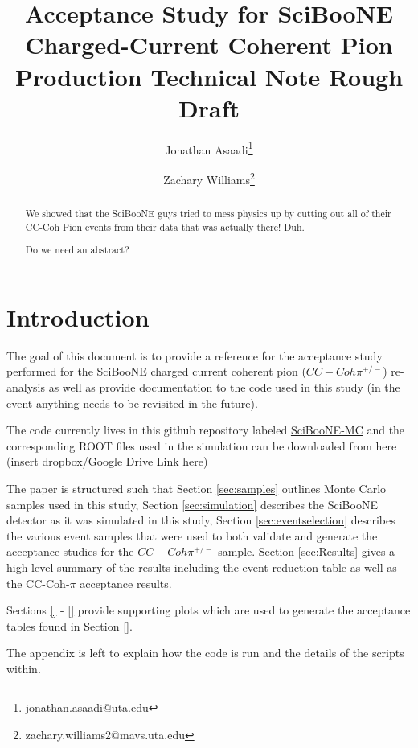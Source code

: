 \documentclass[11pt]{article}
\title{Acceptance Study for SciBooNE Charged-Current Coherent Pion Production Technical Note Rough Draft}
\author[1]{Jonathan Asaadi\thanks{jonathan.asaadi@uta.edu}}
\author[1]{Zachary Williams\thanks{zachary.williams2@mavs.uta.edu}}
\affil[1]{Department of Physics, The University of Texas at Arlington}
\begin{document}
\begin{minipage}[h]{\textwidth}
\maketitle
\begin{abstract}
We showed that the SciBooNE guys tried to mess physics up by cutting out all of their CC-Coh Pion events from their data that was actually there! Duh.


Do we need an abstract?
\end{abstract}
\end{minipage}



\section{Introduction}\label{sec:introduction}
The goal of this document is to provide a reference for the acceptance study performed for the SciBooNE charged current coherent pion ($CC-Coh\pi^{+/-}$) re-analysis as well as provide documentation to the code used in this study (in the event anything needs to be revisited in the future).

The code currently lives in this github repository labeled \href{https://github.com/williamszg/SciBooNE-MC}{SciBooNE-MC} and the corresponding ROOT files used in the simulation can be downloaded from here (insert dropbox/Google Drive Link here)

The paper is structured such that Section \ref{sec:samples} outlines Monte Carlo samples used in this study, Section \ref{sec:simulation} describes the SciBooNE detector as it was simulated in this study, Section \ref{sec:eventselection} describes the various event samples that were used to both validate and generate the acceptance studies for the $CC-Coh\pi^{+/-}$ sample. Section \ref{sec:Results} gives a high level summary of the results including the event-reduction table as well as the CC-Coh-$\pi$ acceptance results.

Sections \ref{} - \ref{} provide supporting plots which are used to generate the acceptance tables found in Section \ref{}. 

The appendix is left to explain how the code is run and the details of the scripts within.
\end{document}
